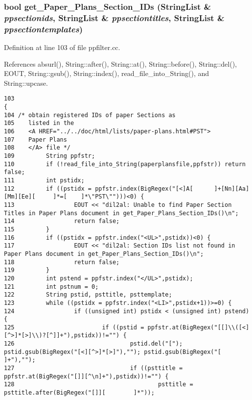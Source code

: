 \subsubsection{\setlength{\rightskip}{0pt plus 5cm}bool get\_\-Paper\_\-Plans\_\-Section\_\-IDs ({\bf String\-List} \& {\em ppsectionids}, {\bf String\-List} \& {\em ppsectiontitles}, {\bf String\-List} \& {\em ppsectiontemplates})}\label{ppfilter_8cc_a2}




Definition at line 103 of file ppfilter.cc.

References absurl(), String::after(), String::at(), String::before(), String::del(), EOUT, String::gsub(), String::index(), read\_\-file\_\-into\_\-String(), and String::upcase.



\footnotesize\begin{verbatim}103                                                                                                                            {
104 /* obtain registered IDs of paper Sections as
105    listed in the
106    <A HREF="../../doc/html/lists/paper-plans.html#PST">
107    Paper Plans
108    </A> file */
109         String ppfstr;
110         if (!read_file_into_String(paperplansfile,ppfstr)) return false;
111         int pstidx;
112         if ((pstidx = ppfstr.index(BigRegex("[<]A[      ]+[Nn][Aa][Mm][Ee][     ]*=[    ]*\"PST\"")))<0) {
113                 EOUT << "dil2al: Unable to find Paper Section Titles in Paper Plans document in get_Paper_Plans_Section_IDs()\n";
114                 return false;
115         }
116         if ((pstidx = ppfstr.index("<UL>",pstidx))<0) {
117                 EOUT << "dil2al: Section IDs list not found in Paper Plans document in get_Paper_Plans_Section_IDs()\n";
118                 return false;
119         }
120         int pstend = ppfstr.index("</UL>",pstidx);
121         int pstnum = 0;
122         String pstid, psttitle, psttemplate;
123         while ((pstidx = ppfstr.index("<LI>",pstidx+1))>=0) {
124                 if ((unsigned int) pstidx < (unsigned int) pstend) {
125                         if ((pstid = ppfstr.at(BigRegex("[[]\\([<][^>]*[>]\\)?[^]]+"),pstidx))!="") {
126                                 pstid.del("["); pstid.gsub(BigRegex("[<][^>]*[>]"),""); pstid.gsub(BigRegex("[  ]+"),"");
127                                 if ((psttitle = ppfstr.at(BigRegex("[]][^\n]+"),pstidx))!="") {
128                                         psttitle = psttitle.after(BigRegex("[]][        ]*"));

\end{verbatim}
